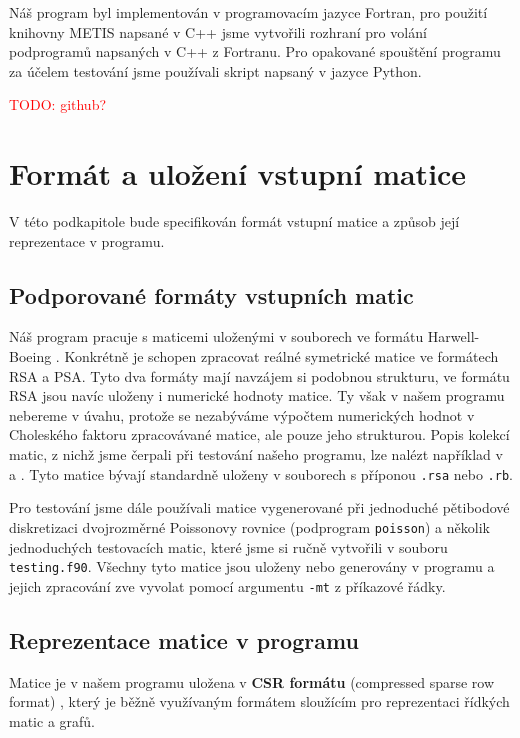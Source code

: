 \documentclass[11pt,american,czech,oneside]{book}
\theoremstyle{plain}
\theoremstyle{definition}
\newcommand{\TODO}[1]{\textcolor{red}{TODO: #1}\PackageWarning{TODO:}{TODO: #1!}}
\begin{document}
Náš program byl implementován v programovacím jazyce Fortran, pro použití knihovny METIS napsané v C++ jsme vytvořili rozhraní pro volání podprogramů napsaných v C++ z Fortranu. Pro opakované spouštění programu za účelem testování jsme používali skript napsaný v jazyce Python.

\TODO{github?}

\section{Formát a uložení vstupní matice}
V této podkapitole bude specifikován formát vstupní matice a způsob její reprezentace v programu.

\subsection{Podporované formáty vstupních matic}

Náš program pracuje s maticemi uloženými v souborech ve formátu Harwell-Boeing \cite{bopo:97}. Konkrétně je schopen zpracovat reálné symetrické matice ve formátech RSA a PSA. Tyto dva formáty mají navzájem si podobnou strukturu, ve formátu RSA jsou navíc uloženy i numerické hodnoty matice. Ty však v našem programu nebereme v úvahu, protože se nezabýváme výpočtem numerických hodnot v Choleského faktoru zpracovávané matice, ale pouze jeho strukturou. Popis kolekcí matic, z nichž jsme čerpali při testování našeho programu, lze nalézt například v \cite{ssmcol} a \cite{hbcol}. Tyto matice bývají standardně uloženy v souborech s příponou \texttt{.rsa} nebo \texttt{.rb}.

Pro testování jsme dále používali matice vygenerované při jednoduché pětibodové diskretizaci dvojrozměrné Poissonovy rovnice (podprogram \texttt{poisson}) a několik jednoduchých testovacích matic, které jsme si ručně vytvořili v souboru \texttt{testing.f90}. Všechny tyto matice jsou uloženy nebo generovány v programu a jejich zpracování zve vyvolat pomocí argumentu \texttt{-mt} z příkazové řádky.

\subsection{Reprezentace matice v programu}
\label{matrixProgReprez}

Matice je v našem programu uložena v \textbf{CSR formátu} (compressed sparse row format) \cite{pis:84,saad:94}, který je běžně využívaným formátem sloužícím pro reprezentaci řídkých matic a grafů.
\end{document}
